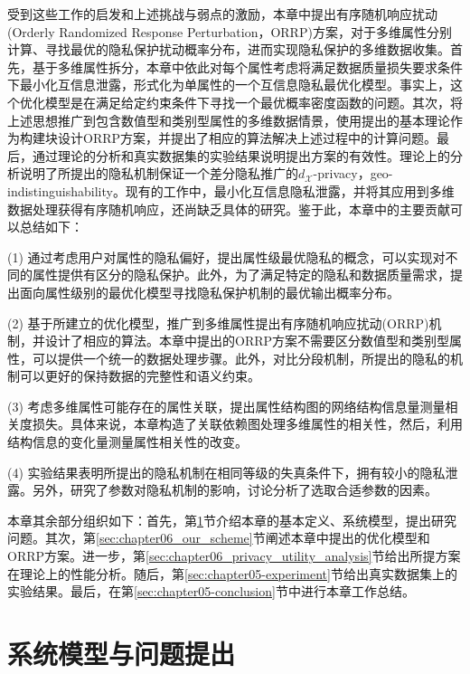 受到这些工作的启发和上述挑战与弱点的激励，本章中提出有序随机响应扰动(Orderly Randomized Response Perturbation，ORRP)方案，对于多维属性分别计算、寻找最优的隐私保护扰动概率分布，进而实现隐私保护的多维数据收集。首先，基于多维属性拆分，本章中依此对每个属性考虑将满足数据质量损失要求条件下最小化互信息泄露，形式化为单属性的一个互信息隐私最优化模型。事实上，这个优化模型是在满足给定约束条件下寻找一个最优概率密度函数的问题。其次，将上述思想推广到包含数值型和类别型属性的多维数据情景，使用提出的基本理论作为构建块设计ORRP方案，并提出了相应的算法解决上述过程中的计算问题。最后，通过理论的分析和真实数据集的实验结果说明提出方案的有效性。理论上的分析说明了所提出的隐私机制保证一个差分隐私推广的$d_{\mathcal{X}}$-privacy\cite{chatzikokolakis2013broadening,bordenabe2014optimal}，geo-indistinguishability\cite{oya2017back}。现有的工作中，最小化互信息隐私泄露，并将其应用到多维数据处理获得有序随机响应，还尚缺乏具体的研究。鉴于此，本章中的主要贡献可以总结如下：

(1) 通过考虑用户对属性的隐私偏好，提出属性级最优隐私的概念，可以实现对不同的属性提供有区分的隐私保护。此外，为了满足特定的隐私和数据质量需求，提出面向属性级别的最优化模型寻找隐私保护机制的最优输出概率分布。


(2) 基于所建立的优化模型，推广到多维属性提出有序随机响应扰动(ORRP)机制，并设计了相应的算法。本章中提出的ORRP方案不需要区分数值型和类别型属性，可以提供一个统一的数据处理步骤。此外，对比分段机制\cite{wang2019collecting}，所提出的隐私的机制可以更好的保持数据的完整性和语义约束。

(3) 考虑多维属性可能存在的属性关联，提出属性结构图的网络结构信息量测量相关度损失。具体来说，本章构造了关联依赖图处理多维属性的相关性，然后，利用结构信息的变化量测量属性相关性的改变。

(4) 实验结果表明所提出的隐私机制在相同等级的失真条件下，拥有较小的隐私泄露。另外，研究了参数对隐私机制的影响，讨论分析了选取合适参数的因素。

本章其余部分组织如下：首先，第\ref{sec:chapter06_system_model}节介绍本章的基本定义、系统模型，提出研究问题。其次，第\ref{sec:chapter06_our_scheme}节阐述本章中提出的优化模型和ORRP方案。进一步，第\ref{sec:chapter06_privacy_utility_analysis}节给出所提方案在理论上的性能分析。随后，第\ref{sec:chapter05-experiment}节给出真实数据集上的实验结果。最后，在第\ref{sec:chapter05-conclusion}节中进行本章工作总结。

\section{系统模型与问题提出}\label{sec:chapter06_system_model}


